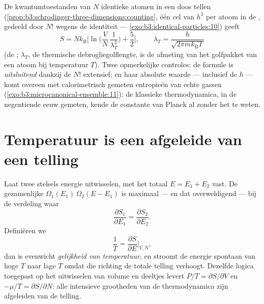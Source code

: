 \begin{proposition}\label{prop:b3:microcanonical-ensemble:gas}
De kwantumtoestanden van $N$ identieke atomen in een doos tellen
(\cref{prop:b3:schrodinger-three-dimensions:counting}, één cel van $h^3$
per atoom in de , gedeeld door $N!$ wegens de identiteit ---
\cref{exo:b3:identical-particles:10}) geeft
\[
S = Nk_{\text{B}}\Big[\ln\Big(\frac VN\,\frac1{\lambda_T^3}\Big)
 + \frac52\Big] , \qquad
\lambda_T = \frac{h}{\sqrt{2\pi mk_{\text{B}}T}}
\]
(de \emph{}; $\lambda_T$, de thermische
debrogliegolflengte, is de afmeting van het golfpakket van een atoom bij
temperatuur $T$). Twee opmerkelijke controles: de formule is
\emph{uitsluitend} dankzij de $N!$ extensief; en haar absolute waarde ---
inclusief de $h$ --- komt overeen met calorimetrisch gemeten entropieën van
echte gassen (\cref{exo:b3:microcanonical-ensemble:11}): de klassieke
thermodynamica, in de negentiende eeuw gemeten, kende de constante van
Planck al zonder het te weten.
\end{proposition}
\admitted

\section{Temperatuur is een afgeleide van een telling}

\begin{theorem}\label{thm:b3:microcanonical-ensemble:temperature}
Laat twee stelsels energie uitwisselen, met het totaal $E = E_1 + E_2$
vast. De gezamenlijke  $\Omega_1(E_1)\,\Omega_2(E - E_1)$ is
maximaal --- en dat overweldigend --- bij de verdeling waar
\[
\frac{\partial S_1}{\partial E_1} =
\frac{\partial S_2}{\partial E_2} .
\]
Definiëren we
\[
\frac1T = \frac{\partial S}{\partial E}\bigg|_{V,N} ,
\]
dan is evenwicht \emph{gelijkheid van temperatuur}, en stroomt de energie
spontaan van hoge $T$ naar lage $T$ omdat die richting de totale telling
verhoogt. Dezelfde logica toegepast op het uitwisselen van volume en
deeltjes levert $P/T = \partial S/\partial V$ en $-\mu/T
= \partial S/\partial N$: alle intensieve grootheden van de thermodynamica zijn
afgeleiden van de telling.
\end{theorem}

